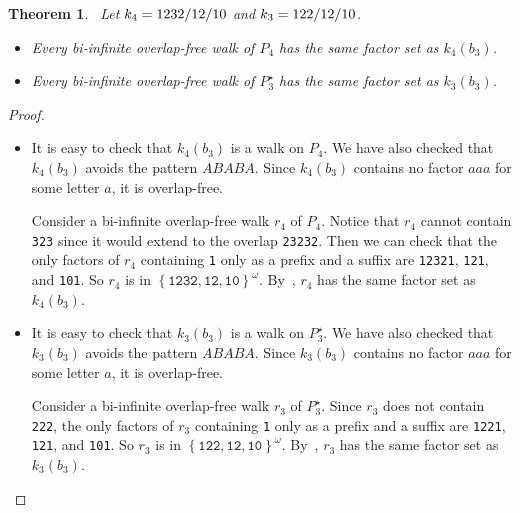 \documentclass{article}
\def\acc#1{\left\{ #1 \right\}}
\theoremstyle{plain}
\newtheorem{theorem}{Theorem}
\theoremstyle{definition}
\theoremstyle{remark}
\begin{document}
\begin{theorem}{\ }\label{thm:p4p3}
Let $k_4=\textnormal{\texttt{1232}}/\textnormal{\texttt{12}}/\textnormal{\texttt{10}}$ and $k_3=\textnormal{\texttt{122}}/\textnormal{\texttt{12}}/\textnormal{\texttt{10}}$.
\begin{itemize}
 \item Every bi-infinite overlap-free walk of $P_4$ has the same factor set as $k_4(b_3)$.
 \item Every bi-infinite overlap-free walk of $P_3^\star$ has the same factor set as $k_3(b_3)$.
\end{itemize}
\end{theorem}

\begin{proof}{\ }
\begin{itemize}
\item It is easy to check that $k_4(b_3)$ is a walk on $P_4$.
We have also checked that $k_4(b_3)$ avoids the pattern $ABABA$.
Since $k_4(b_3)$ contains no factor $aaa$ for some letter $a$, it is overlap-free.

Consider a bi-infinite overlap-free walk $r_4$ of $P_4$.
Notice that $r_4$ cannot contain \texttt{323} since it would extend to the overlap \texttt{23232}.
Then we can check that the only factors of $r_4$ containing \texttt{1} only as a prefix and a suffix are
\texttt{12321}, \texttt{121}, and \texttt{101}.
So $r_4$ is in $\acc{\texttt{1232},{\texttt{12}},{\texttt{10}}}^\omega$.
By~, $r_4$ has the same factor set as $k_4(b_3)$.

\item It is easy to check that $k_3(b_3)$ is a walk on $P_3^\star$.
We have also checked that $k_3(b_3)$ avoids the pattern $ABABA$.
Since $k_3(b_3)$ contains no factor $aaa$ for some letter $a$, it is overlap-free.

Consider a bi-infinite overlap-free walk $r_3$ of $P_3^\star$.
Since $r_3$ does not contain \texttt{222}, the only factors of $r_3$ containing \texttt{1}
only as a prefix and a suffix are \texttt{1221}, \texttt{121}, and \texttt{101}.
So $r_3$ is in $\acc{\texttt{122}, \texttt{12}, \texttt{10}}^\omega$.
By~, $r_3$ has the same factor set as $k_3(b_3)$.
\end{itemize}
\end{proof}
\end{document}
